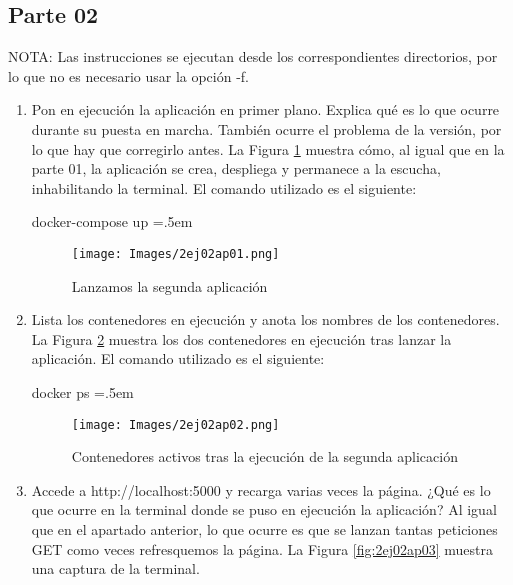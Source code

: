 \documentclass[12pt,a4paper]{article}
\newenvironment{lcverbatim}
 {\SaveVerbatim{cverb}}
 {\endSaveVerbatim
  \flushleft\fboxrule=0pt\fboxsep=.5em
  \colorbox{cverbbg}{%
    \makebox[\dimexpr\linewidth-2\fboxsep][l]{\BUseVerbatim{cverb}}%
  }
  \endflushleft
}
\begin{document}
%
%
%
%

\subsection{Parte 02}

NOTA: Las instrucciones se ejecutan desde los correspondientes directorios, por lo que no es necesario usar la opción -f.

\begin{enumerate}
\item Pon en ejecución la aplicación en primer plano. Explica qué es lo que ocurre durante su
puesta en marcha. También ocurre el problema de la versión, por lo que hay que corregirlo antes. La Figura \ref{fig:2ej02ap01} muestra cómo, al igual que en la parte 01, la aplicación se crea, despliega y permanece a la escucha, inhabilitando la terminal. El comando utilizado es el siguiente:

\begin{lcverbatim}
docker-compose up
\end{lcverbatim}

\begin{figure}[h]
    \centering
    \texttt{[image: Images/2ej02ap01.png]}
    \caption{Lanzamos la segunda aplicación}
    \label{fig:2ej02ap01}
\end{figure}

\item Lista los contenedores en ejecución y anota los nombres de los contenedores. La Figura \ref{fig:2ej02ap02} muestra los dos contenedores en ejecución tras lanzar la aplicación. El comando utilizado es el siguiente:

\begin{lcverbatim}
docker ps
\end{lcverbatim}

\begin{figure}[h]
    \centering
    \texttt{[image: Images/2ej02ap02.png]}
    \caption{Contenedores activos tras la ejecución de la segunda aplicación}
    \label{fig:2ej02ap02}
\end{figure}

\item Accede a http://localhost:5000 y recarga varias veces la página. ¿Qué es lo que ocurre
en la terminal donde se puso en ejecución la aplicación? Al igual que en el apartado anterior, lo que ocurre es que se lanzan tantas peticiones GET como veces refresquemos la página. La Figura \ref{fig:2ej02ap03} muestra una captura de la terminal.


\end{enumerate}
\end{document}
